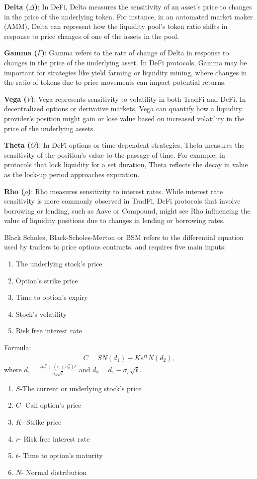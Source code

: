 \documentclass[12pt]{article}
\begin{document}
\textbf{Delta (\(\Delta\))}: In DeFi, Delta measures the sensitivity of an asset's price to changes in the price of the underlying token. For instance, in an automated market maker (AMM), Delta can represent how the liquidity pool's token ratio shifts in response to price changes of one of the assets in the pool.

\textbf{Gamma (\(\Gamma\))}: Gamma refers to the rate of change of Delta in response to changes in the price of the underlying asset. In DeFi protocols, Gamma may be important for strategies like yield farming or liquidity mining, where changes in the ratio of tokens due to price movements can impact potential returns.

\textbf{Vega (\(V\))}: Vega represents sensitivity to volatility in both TradFi and DeFi. In decentralized options or derivative markets, Vega can quantify how a liquidity provider’s position might gain or lose value based on increased volatility in the price of the underlying assets.

\textbf{Theta (\(\Theta\))}: In DeFi options or time-dependent strategies, Theta measures the sensitivity of the position's value to the passage of time. For example, in protocols that lock liquidity for a set duration, Theta reflects the decay in value as the lock-up period approaches expiration.

\textbf{Rho (\(\rho\))}: Rho measures sensitivity to interest rates. While interest rate sensitivity is more commonly observed in TradFi, DeFi protocols that involve borrowing or lending, such as Aave or Compound, might see Rho influencing the value of liquidity positions due to changes in lending or borrowing rates.

Black Scholes, Black-Scholes-Merton or BSM refers to the differential equation used by traders to price options contracts, and requires five main inputs:
\begin{enumerate}
    \item The underlying stock's price
    \item Option's strike price
    \item Time to option's expiry
    \item Stock's volatility
    \item Risk free interest rate
\end{enumerate}

Formula:
\begin{align*}
    C = SN(d_1) -Ke^{rt}N(d_2),
\end{align*}
where $d_1 = \frac{ln_{s}^{k} + (r+ \sigma_{v}^{2})t}{\sigma_s \sqrt{t}}$ and $d_2=d_1-\sigma_s \sqrt{t}$.
\begin{enumerate}
    \item $S$-The current or underlying stock's price
    \item $C$- Call option's price
    \item $K$- Strike price
    \item $r$- Risk free interest rate
    \item $t$- Time to option's maturity
    \item $N$- Normal distribution
\end{enumerate}
\end{document}
